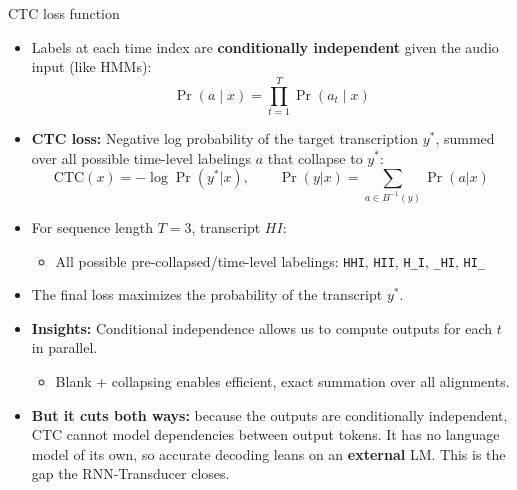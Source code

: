 \begin{frame}{CTC loss function}
  \begin{itemize}\footnotesize
    \item Labels at each time index are \textbf{conditionally independent} given the audio input (like HMMs):
      \[
        \Pr(a \mid x) = \prod_{t=1}^T \Pr(a_t \mid x)
      \]
    \item \textbf{CTC loss:} Negative log probability of the target transcription $y^*$, summed over all possible time-level labelings $a$ that collapse to $y^*$:
      \[
        \text{CTC}(x) = -\log \Pr(y^*|x), \qquad
        \Pr(y|x) = \sum_{a \in B^{-1}(y)} \Pr(a|x)
      \]
    \item For sequence length $T=3$, transcript $HI$:
      \begin{itemize}
        \item All possible pre-collapsed/time-level labelings: \texttt{HHI}, \texttt{HII}, \texttt{H\_I}, \texttt{\_HI}, \texttt{HI\_}
      \end{itemize}
    \item The final loss maximizes the probability of the transcript $y^*$.
    \item \textbf{Insights:} Conditional independence allows us to compute outputs for each $t$ in parallel.
      \begin{itemize}
        \item Blank + collapsing enables efficient, exact summation over all alignments.
      \end{itemize}
    \item \textbf{But it cuts both ways:} because the outputs are conditionally independent, CTC cannot model
      dependencies between output tokens. It has no language model of its own, so accurate decoding leans on
      an \textbf{external} LM. This is the gap the RNN-Transducer closes.
  \end{itemize}
\end{frame}

